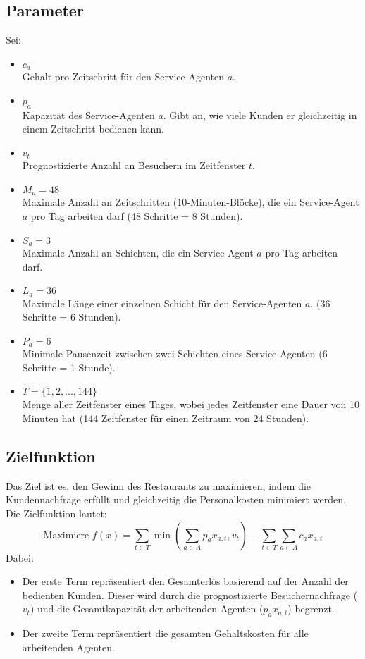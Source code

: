 \subsection*{Parameter}
Sei:
\begin{itemize}
    \item $ c_a $\\
          Gehalt pro Zeitschritt für den Service-Agenten $ a $.
    \item $ p_a $\\
          Kapazität des Service-Agenten $ a $. Gibt an, wie viele Kunden er gleichzeitig in einem Zeitschritt bedienen kann.
    \item $ v_t $\\
          Prognostizierte Anzahl an Besuchern im Zeitfenster $ t $.
    \item $ M_a = 48 $\\
          Maximale Anzahl an Zeitschritten (10-Minuten-Blöcke), die ein Service-Agent $ a $ pro Tag arbeiten darf (48 Schritte = 8 Stunden).
    \item $ S_a = 3 $\\
          Maximale Anzahl an Schichten, die ein Service-Agent $ a $ pro Tag arbeiten darf.
    \item $ L_a = 36 $\\
          Maximale Länge einer einzelnen Schicht für den Service-Agenten $ a $. (36 Schritte = 6 Stunden).
    \item $ P_a = 6 $\\
          Minimale Pausenzeit zwischen zwei Schichten eines Service-Agenten (6 Schritte = 1 Stunde).
    \item $ T = \{1, 2, ..., 144\}$\\
          Menge aller Zeitfenster eines Tages, wobei jedes Zeitfenster eine Dauer von 10 Minuten hat (144 Zeitfenster für einen Zeitraum von 24 Stunden).
\end{itemize}

\subsection*{Zielfunktion}
Das Ziel ist es, den Gewinn des Restaurants zu maximieren, indem die Kundennachfrage erfüllt und gleichzeitig die Personalkosten minimiert werden. Die Zielfunktion lautet:
$$\text{Maximiere } f(x) = \sum_{t \in T} \min\left(\sum_{a \in A} p_a x_{a,t}, v_t\right) - \sum_{t \in T} \sum_{a \in A} c_a x_{a,t}$$
Dabei:
\begin{itemize}
    \item Der erste Term repräsentiert den Gesamterlös basierend auf der Anzahl der bedienten Kunden. Dieser wird durch die prognostizierte Besuchernachfrage ($v_t$) und die Gesamtkapazität der arbeitenden Agenten ($p_a x_{a,t}$) begrenzt.
    \item Der zweite Term repräsentiert die gesamten Gehaltskosten für alle arbeitenden Agenten.
\end{itemize}

